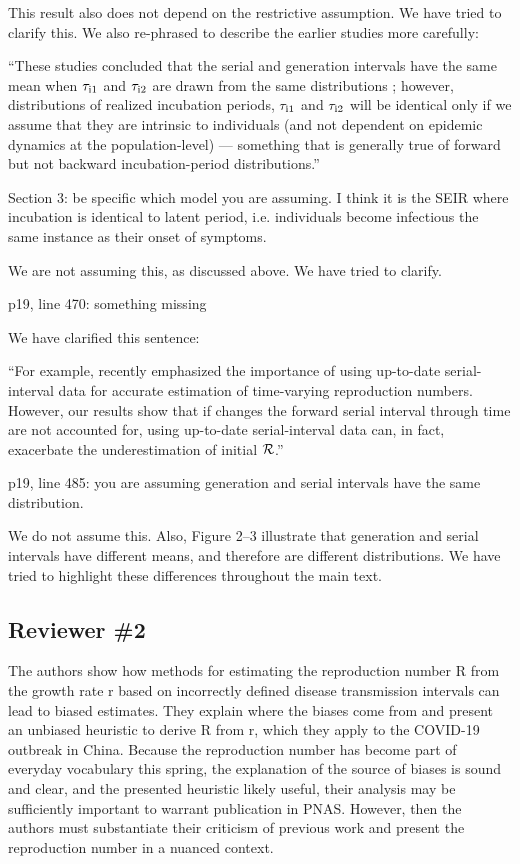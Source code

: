 \documentclass[12pt]{article}
\newcommand{\RR}{\ensuremath{{\cal R}}}
\newcommand{\rev}{\subsection*}
\newcommand{\revtext}{\textsf}
\begin{document}
This result also does not depend on the restrictive assumption. We have tried to clarify this. We also re-phrased to describe the earlier studies more carefully:

``These studies concluded that the serial and generation intervals have the same mean when $\tau_{\rm i1}$ and $\tau_{\rm i2}$ are drawn from the same distributions \citep{svensson2007note,klinkenberg2011correlation,champredon2018equivalence, britton2019estimation};
however, distributions of realized incubation periods, $\tau_{\rm i1}$ and $\tau_{\rm i2}$ will be identical only if we assume that they are intrinsic to individuals (and not dependent on epidemic dynamics at the population-level) ---
something that is generally true of forward but not backward incubation-period distributions.''

\revtext{Section 3: be specific which model you are assuming. I think it is the SEIR where incubation is identical to latent period, i.e. individuals become infectious the same instance as their onset of symptoms.}

We are not assuming this, as discussed above. We have tried to clarify.

\revtext{p19, line 470: something missing}

We have clarified this sentence:

``For example, \cite{thompson2019improved} recently emphasized the importance of using up-to-date serial-interval data for accurate estimation of time-varying reproduction numbers.
However, our results show that if changes the forward serial interval through time are not accounted for, using up-to-date serial-interval data can, in fact, exacerbate the underestimation of initial \RR.''

\revtext{p19, line 485: you are assuming generation and serial intervals have the same distribution.}

We do not assume this. Also, Figure 2--3 illustrate that generation and serial intervals have different means, and therefore are different distributions. We have tried to highlight these differences throughout the main text.

\rev{Reviewer \#2}

\revtext{The authors show how methods for estimating the reproduction number R from the growth rate r based on incorrectly defined disease transmission intervals can lead to biased estimates. They explain where the biases come from and present an unbiased heuristic to derive R from r, which they apply to the COVID-19 outbreak in China. Because the reproduction number has become part of everyday vocabulary this spring, the explanation of the source of biases is sound and clear, and the presented heuristic likely useful, their analysis may be sufficiently important to warrant publication in PNAS. However, then the authors must substantiate their criticism of previous work and present the reproduction number in a nuanced context.}
\end{document}
